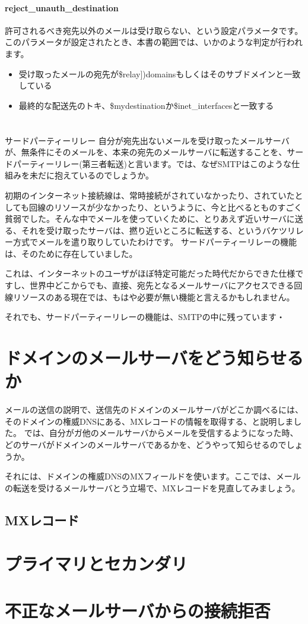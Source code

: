 \paragraph{reject\_unauth\_destination}
許可されるべき宛先以外のメールは受け取らない、という設定パラメータです。このパラメータが設定されたとき、本書の範囲では、いかのような判定が行われます。

\begin{itemize}
  \item 受け取ったメールの宛先が\$relay])domainsもしくはそのサブドメインと一致している
  \item 最終的な配送先のトキ、\$mydestinationか\$inet\_interfacesと一致する
\end{itemize}

\section*{}
\begin{itembox}[l]{サードパーティーリレー}
自分が宛先出ないメールを受け取ったメールサーバが、無条件にそのメールを、本来の宛先のメールサーバに転送することを、サードパーティーリレー(第三者転送)と言います。では、なぜSMTPはこのような仕組みを未だに抱えているのでしょうか。

初期のインターネット接続線は、常時接続がされていなかったり、されていたとしても回線のリソースが少なかったり、というように、今と比べるとものすごく貧弱でした。そんな中でメールを使っていくために、とりあえず近いサーバに送る、それを受け取ったサーバは、撚り近いところに転送する、というバケツリレー方式でメールを遣り取りしていたわけです。
サードパーティーリレーの機能は、そのために存在していました。

これは、インターネットのユーザがほぼ特定可能だった時代だからできた仕様ですし、世界中どこからでも、直接、宛先となるメールサーバにアクセスできる回線リソースのある現在では、もはや必要が無い機能と言えるかもしれません。

それでも、サードパーティーリレーの機能は、SMTPの中に残っています・

\end{itembox}


\section{ドメインのメールサーバをどう知らせるか}
メールの送信の説明で、送信先のドメインのメールサーバがどこか調べるには、そのドメインの権威DNSにある、MXレコードの情報を取得する、と説明しました。
では、自分がガ他のメールサーバからメールを受信するようになった時、どのサーバがドメインのメールサーバであるかを、どうやって知らせるのでしょうか。

それには、ドメインの権威DNSのMXフィールドを使います。ここでは、メールの転送を受けるメールサーバとう立場で、MXレコードを見直してみましょう。



\subsection{MXレコード}


\section{プライマリとセカンダリ}

\section{不正なメールサーバからの接続拒否}